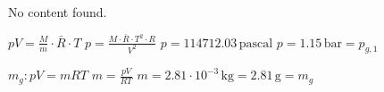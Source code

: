 No content found.

\( pV = \frac{M}{m} \cdot \bar{R} \cdot T \)  
\( p = \frac{M \cdot \bar{R} \cdot T^2 \cdot R}{V^2} \)  
\( p = 114712.03 \, \text{pascal} \)  
\( p = 1.15 \, \text{bar} = p_{g,1} \)  

\( m_g: pV = mRT \)  
\( m = \frac{pV}{RT} \)  
\( m = 2.81 \cdot 10^{-3} \, \text{kg} = 2.81 \, \text{g} = m_g \)